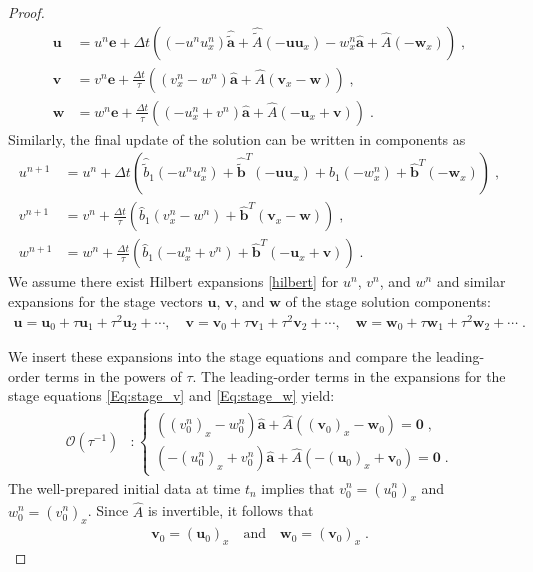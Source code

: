\documentclass[10pt,a4paper]{amsart}
\newcommand{\tIIAex}{\hat{\tilde{A}}}
\newcommand{\tIIAim}{\hat{A}}
\newcommand{\tIIaex}{\pmb{\hat{\tilde{a}}}}
\newcommand{\tIIaim}{\pmb{\hat{a}}}
\newcommand{\tIIbexf}{\hat{\tilde{b}}_1}
\newcommand{\tIIbex}{\pmb{\hat{\tilde{b}}}}
\newcommand{\tIIbimf}{\hat{b}_1}
\newcommand{\tIIbim}{\pmb{\hat{b}}}
\begin{document}
\begin{proof}
\begin{subequations}
\begin{align}
    \pmb{u} &= u^n \pmb{e} + \Delta t \left( (-u^n u_{x}^n)\tIIaex + \tIIAex (-\pmb{u} \pmb{u}_x)  -w_x^n \tIIaim + \tIIAim(-\pmb{w}_x) \right) \;, \label{Eq:stage_u} \\
    \pmb{v} &= v^n \pmb{e} + \frac{\Delta t}{\tau} \left( (v_x^n - w^n) \tIIaim + \tIIAim(\pmb{v}_x-\pmb{w})\right) \;, \label{Eq:stage_v} \\
    \pmb{w} &= w^n \pmb{e} + \frac{\Delta t}{\tau} \left( (-u_x^n + v^n) \tIIaim + \tIIAim(-\pmb{u}_x+\pmb{v})\right) \;. \label{Eq:stage_w}
\end{align}
\end{subequations}
Similarly, the final update of the solution can be written in components as
\begin{subequations}
\begin{align}
    u^{n+1} &= u^n  + \Delta t \left( \tIIbexf(-u^n u_{x}^n) +  \tIIbex^T  (-\pmb{u} \pmb{u}_x) + \tIIbimf(-w_x^n)  + \tIIbim^T  (-\pmb{w}_x)  \right) \;, \label{Eq:sol_u} \\
    v^{n+1} &= v^n  + \frac{\Delta t}{\tau} \left( \tIIbimf(v_x^n - w^n)  + \tIIbim^T  (\pmb{v}_x-\pmb{w}) \right) \;, \label{Eq:sol_v} \\
    w^{n+1} &= w^n + \frac{\Delta t}{\tau} \left( \tIIbimf(-u_x^n + v^n)  + \tIIbim^T  (-\pmb{u}_x+\pmb{v}) \right)  \;. \label{Eq:sol_w}
\end{align}
\end{subequations}
We assume there exist Hilbert expansions \eqref{hilbert} for $u^n$, $v^n$, and $w^n$
and similar expansions for the stage vectors $\pmb{u}$, $\pmb{v}$, and $\pmb{w}$ of the stage solution components:
\begin{align*}
\pmb{u} = \pmb{u}_0 + \tau \pmb{u}_1 + \tau^2 \pmb{u}_2 + \cdots, \quad \pmb{v}  = \pmb{v}_0 + \tau \pmb{v}_1 + \tau^2 \pmb{v}_2 + \cdots, \quad \pmb{w} = \pmb{w}_0 + \tau \pmb{w}_1 + \tau^2 \pmb{w}_2 + \cdots \;.
\end{align*}

We insert these expansions into the stage equations and compare the leading-order terms in the powers of $\tau$.
The leading-order terms in the expansions for the stage equations \eqref{Eq:stage_v} and \eqref{Eq:stage_w} yield:
\begin{align*}
    \mathcal{O}\left(\tau^{-1}\right) &\colon
    \begin{cases}
        \left((v_0^n)_x - w_0^n \right) \tIIaim + \tIIAim  \left((\pmb{v}_0)_x - \pmb{w}_0\right) = \pmb{0} \;, \\
        \left(-(u_0^n)_x + v_0^n \right) \tIIaim + \tIIAim  \left(-(\pmb{u}_0)_x + \pmb{v}_0\right) = \pmb{0} \;.
    \end{cases}
\end{align*}
The well-prepared initial data at time $t_n$ implies that $v_0^n = (u_0^n)_x$ and $w_0^n = (v_0^n)_x$.
Since $\tIIAim$ is invertible, it follows that
\begin{align}\label{Eq:Aux_var_rel}
   \pmb{v}_0 = (\pmb{u}_0)_x \quad \text{and} \quad \pmb{w}_0 = (\pmb{v}_0)_x \;.
\end{align}


\end{proof}
\end{document}

